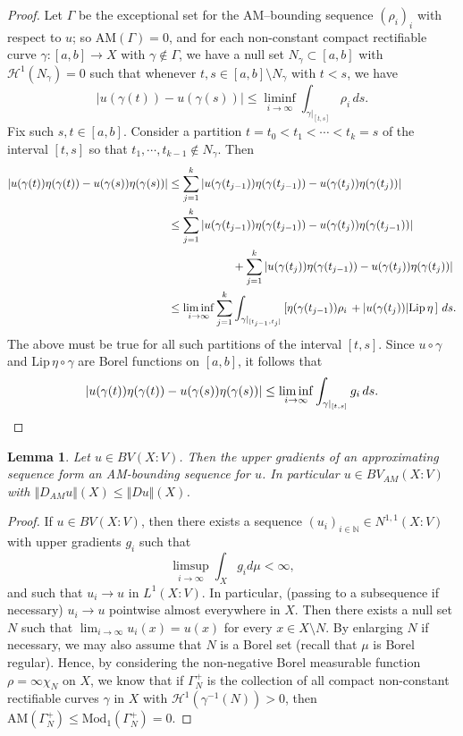 \documentclass[11pt, letterpaper]{amsart} %
\newcommand*{\N}{{\mathbb N}}
\newcommand*{\Mod}{\text{Mod}_1}
\newcommand*{\AM}{\text{AM}}
\numberwithin{equation}{section}
\theoremstyle{plain}
\newtheorem{lemma}[equation]{Lemma}
\theoremstyle{definition}
\begin{document}
{\begin{proof}
Let $\Gamma$ be the exceptional set for the AM--bounding sequence $(\rho_i)_i$ with respect to $u$; so 
$\AM(\Gamma)=0$, and for each non-constant compact rectifiable curve $\gamma:[a,b]\to X$ with $\gamma\not\in\Gamma$,
we have a null set $N_\gamma\subset [a,b]$ with $\mathcal{H}^1(N_\gamma)=0$ such that whenever
$t,s\in[a,b]\setminus N_\gamma$ with $t<s$, we have
\[
|u(\gamma(t))-u(\gamma(s))|\le \liminf_{i\to\infty}\int_{\gamma\vert_{[t,s]}}\rho_i\, ds.
\]
Fix such $s,t\in[a,b]$. 
Consider a partition $t=t_0<t_1<\cdots<t_k=s$ of the interval $[t,s]$ so that $t_1,\cdots, t_{k-1}\not\in N_\gamma$.
Then
\begin{align*}
|u(\gamma(t))\eta(\gamma(t))-u(\gamma(s))\eta(\gamma(s))|
&\le\sum_{j=1}^k|u(\gamma(t_{j-1}))\eta(\gamma(t_{j-1}))-u(\gamma(t_{j}))\eta(\gamma(t_{j}))|\\
&\le \sum_{j=1}^k|u(\gamma(t_{j-1}))\eta(\gamma(t_{j-1}))-u(\gamma(t_{j}))\eta(\gamma(t_{j-1}))|\\
 &\hskip 2cm+\sum_{j=1}^k|u(\gamma(t_{j}))\eta(\gamma(t_{j-1}))-u(\gamma(t_{j}))\eta(\gamma(t_{j}))|\\
&\le \liminf_{i\to\infty}\sum_{j=1}^k\int_{\gamma\vert_{[t_{j-1},t_j]}}\left[\eta(\gamma(t_{j-1}))\rho_i\, 
+|u(\gamma(t_j))|\text{Lip}\,\eta\, \right]\, ds.
\end{align*}
The above must be true for all such partitions of the interval $[t,s]$.
Since $u\circ\gamma$ and $\text{Lip}\,\eta\circ\gamma$ are Borel functions on $[a,b]$, it follows that
\[
|u(\gamma(t))\eta(\gamma(t))-u(\gamma(s))\eta(\gamma(s))|
\le\liminf_{i\to\infty}\int_{\gamma\vert_{[t,s]}}g_i\, ds.\qedhere
\]
\end{proof}



\begin{lemma}\label{lem:BVinBVAM}
Let $u\in BV(X:V)$.  Then the upper gradients of an approximating sequence form an AM-bounding sequence for $u$. 
In particular $u\in BV_{AM}(X:V)$ with $\Vert D_{AM}u\Vert(X)\le \Vert Du\Vert(X)$. 
\end{lemma}

\begin{proof}
If $u\in BV(X:V)$, then there exists a sequence $(u_i)_{i\in\N}\in N^{1,1}(X:V)$ with upper gradients $g_i$ such that 
\[
\limsup_{i\to\infty}\int_X g_id\mu <\infty,
\]
and such that $u_i\to u$ in $L^1(X:V)$. In particular, (passing to a subsequence 
if necessary) $u_i\to u$ pointwise almost everywhere in $X$. Then there exists a null set 
$N$ such that $\lim_{i\to\infty} u_i(x)=u(x)$ for every $x\in X\setminus N$. By enlarging $N$ if necessary, we may also
assume that $N$ is a Borel set (recall that $\mu$ is Borel regular).
Hence, by considering the non-negative Borel measurable function $\rho=\infty\chi_N$ on $X$, we know 
that if $\Gamma_N^+$ is the collection of all compact non-constant rectifiable curves $\gamma$ in $X$
with $\mathcal{H}^1(\gamma^{-1}(N))>0$, then $\AM(\Gamma_N^+)\le \Mod(\Gamma_N^+)=0$.


\end{proof}}
\end{document}
